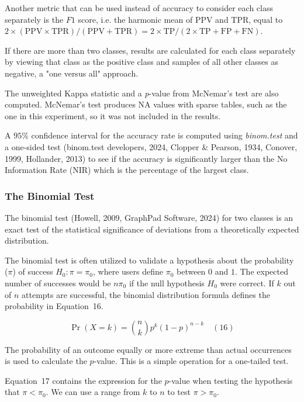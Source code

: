\documentclass[sn-mathphys-num]{sn-jnl}%
\begin{document}
Another metric that can be used instead of accuracy to consider each class separately is the $F1$ score, i.e. the harmonic mean of PPV and TPR, equal to $2 \times (\mathrm{PPV} \times \mathrm{TPR}) / (\mathrm{PPV} + \mathrm{TPR}) = 2 \times \mathrm{TP} / (2 \times \mathrm{TP} + \mathrm{FP} + \mathrm{FN})$.

If there are more than two classes, results are calculated for each class separately by viewing that class as the positive class and samples of all other classes as negative, a "one versus all" approach.

The unweighted Kappa statistic and a \textit{p}-value from McNemar's test are also computed. McNemar's test produces NA values with sparse tables, such as the one in this experiment, so it was not included in the results.

A $95\%$ confidence interval for the accuracy rate is computed using \textit{binom.test} and a one-sided test (binom.test developers, 2024, Clopper & Pearson, 1934, Conover, 1999, Hollander, 2013) to see if the accuracy is significantly larger than the No Information Rate (NIR) which is the percentage of the largest class.

\subsubsection{The Binomial Test}

The binomial test (Howell, 2009, GraphPad Software, 2024) for two classes is an exact test of the statistical significance of deviations from a theoretically expected distribution.

The binomial test is often utilized to validate a hypothesis about the probability ($\pi$) of success $H_{0}\colon \pi =\pi_{0}$, where users define $\pi_{0}$ between $0$ and $1$. The expected number of successes would be $n\pi_{0}$ if the null hypothesis $H_{0}$ were correct. If $k$ out of $n$ attempts are successful, the binomial distribution formula defines the probability in Equation~16.

\begin{equation}
	\Pr(X=k)={\binom{n}{k}}p^{k}(1-p)^{n-k}
	\quad\left(16\right)
\end{equation}

The probability of an outcome equally or more extreme than actual occurrences is used to calculate the $p$-value. This is a simple operation for a one-tailed test. 

Equation~17 contains the expression for the $p$-value when testing the hypothesis that $\pi <\pi_{0}$. We can use a range from $k$ to $n$ to test $\pi >\pi_{0}$.
\end{document}
